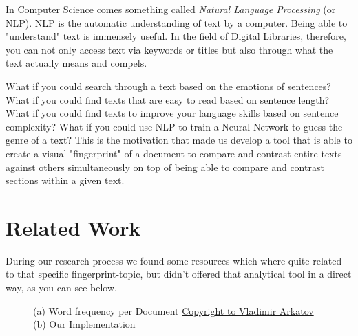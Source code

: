 \documentclass[runningheads]{llncs}
\begin{document}
In Computer Science comes something called \textit{Natural Language Processing} (or NLP). NLP is the automatic understanding of text by a computer. Being able to "understand" text is immensely useful. In the field of Digital Libraries, therefore, you can not only access text via keywords or titles but also through what the text actually means and compels.

What if you could search through a text based on the emotions of sentences? What if you could find texts that are easy to read based on sentence length? What if you could find texts to improve your language skills based on sentence complexity? What if you could use NLP to train a Neural Network to guess the genre of a text? This is the motivation that made us develop a tool that is able to create a visual "fingerprint" of a document to compare and contrast entire texts against others simultaneously on top of being able to compare and contrast sections within a given text.


\section{Related Work}
During our research process we found some resources which where quite related to that specific fingerprint-topic, but didn't offered that analytical tool in a direct way, as you can see below.

\begin{figure}
    \centering
    \caption{(a) Word frequency per Document \href{https://www.123rf.com/photo_36990141_stock-vector-infographics-with-sound-waves-on-world.html}{Copyright to Vladimir Arkatov} (b) \label{density-plot} Our Implementation}
    \label{fig:circle-digram}
\end{figure}
\end{document}
